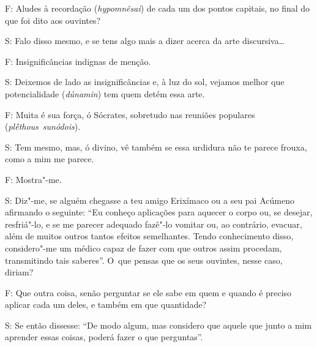  

F: Aludes à recordação (\emph{hypomnêsai}) de cada um dos pontos
capitais, no final do que foi dito aos ouvintes?

 

S: Falo disso mesmo, e se tens algo mais a dizer acerca da arte
discursiva…

 

F: Insignificâncias indignas de menção.

 

\bekker{[268a]} S: Deixemos de lado as insignificâncias e, à luz do sol,
vejamos melhor que potencialidade (\emph{dúnamin}) tem quem detém essa
arte.

 

F: Muita é sua força, ó Sócrates, sobretudo nas reuniões populares
(\emph{plḗthous}~\emph{sunódois}).

 

S: Tem mesmo, mas, ó divino, vê também se essa urdidura não te parece
frouxa, como a mim me parece.
 
F: Mostra"-me.

 

S: Diz"-me, se alguém chegasse a teu amigo Erixímaco ou a seu pai Acúmeno
afirmando o seguinte: ``Eu conheço aplicações para aquecer o corpo ou,
se desejar, resfriá"-lo, e se me parecer adequado fazê"-lo vomitar ou, ao
contrário, evacuar, além de muitos outros tantos efeitos semelhantes.
\bekker{[268b]} Tendo conhecimento disso, considero"-me um médico capaz de
fazer com que outros assim procedam, transmitindo tais saberes''. O~que
pensas que os seus ouvintes, nesse caso, diriam?

 

F: Que outra coisa, senão perguntar se ele sabe em quem e quando é
preciso aplicar cada um deles, e também em que quantidade?

 

S: Se então dissesse: ``De modo algum, mas considero que aquele que
junto a mim aprender essas coisas, poderá fazer o que
perguntas''.

